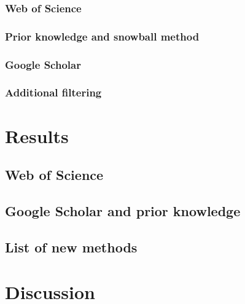 \documentclass[12pt,twoside,openany]{reedthesis}
\begin{document}
\hypertarget{web-of-science}{%
\subsubsection{Web of Science}\label{web-of-science}}

\hypertarget{prior-knowledge-and-snowball-method}{%
\subsubsection{Prior knowledge and snowball method}\label{prior-knowledge-and-snowball-method}}

\hypertarget{google-scholar}{%
\subsubsection{Google Scholar}\label{google-scholar}}

\hypertarget{additional-filtering}{%
\subsubsection{Additional filtering}\label{additional-filtering}}

\hypertarget{results}{%
\section{Results}\label{results}}

\hypertarget{web-of-science-1}{%
\subsection{Web of Science}\label{web-of-science-1}}

\hypertarget{google-scholar-and-prior-knowledge}{%
\subsection{Google Scholar and prior knowledge}\label{google-scholar-and-prior-knowledge}}

\hypertarget{list-of-new-methods}{%
\subsection{List of new methods}\label{list-of-new-methods}}

\hypertarget{discussion}{%
\section{Discussion}\label{discussion}}
\end{document}
